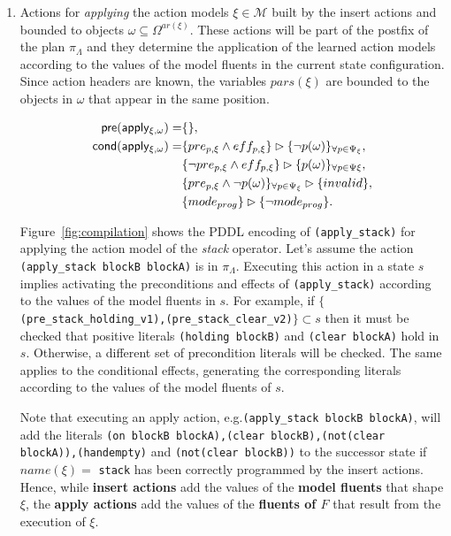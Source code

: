 \documentclass[runningheads]{llncs}
\newcommand{\pre}{\mathsf{pre}}     %
\newcommand{\cond}{\mathsf{cond}}   %
\begin{document}
\begin{itemize}
\begin{enumerate}
\item Actions for {\em applying} the action models $\xi\in\mathcal{M}$ built by the insert actions and bounded to objects $\omega\subseteq\Omega^{ar(\xi)}$. These actions will be part of the postfix of the plan $\pi_\Lambda$ and they determine the application of the learned action models according to the values of the model fluents in the current state configuration. Since action headers are known, the variables $pars(\xi)$ are bounded to the objects in $\omega$ that appear in the same position.

\begin{small}
\begin{align*}
\hspace*{7pt}\pre(\mathsf{apply_{\xi,\omega}})=&\{\},\\
\cond(\mathsf{apply_{\xi,\omega}})=& \{pre_{p,\xi}\wedge eff_{p,\xi}\}\rhd\{\neg p(\omega)\}_{\forall p\in\Psi_\xi},\\
& \{\neg pre_{p,\xi}\wedge eff_{p,\xi}\}\rhd\{p(\omega)\}_{\forall p\in\Psi\xi},\\
& \{pre_{p,\xi}\wedge \neg p(\omega)\}_{\forall p\in\Psi_\xi}\rhd\{invalid\},\\
&\{mode_{prog}\}\rhd\{\neg mode_{prog}\}.
\end{align*}
\end{small}

Figure~\ref{fig:compilation} shows the PDDL encoding of {\tt{\small (apply\_stack)}} for applying the action model of the {\em stack} operator. Let's assume the action {\tt{\small (apply\_stack blockB blockA)}} is in $\pi_\Lambda$. Executing this action in a state $s$ implies activating the preconditions and effects of {\tt{\small (apply\_stack)}} according to the values of the model fluents in $s$. For example, if  $\{${\tt{\small (pre\_stack\_holding\_v1),(pre\_stack\_clear\_v2)}}$\} \subset s$ then it must be checked that positive literals {\tt{\small (holding blockB)}} and {\tt{\small (clear blockA)}} hold in $s$. Otherwise, a different set of precondition literals will be checked. The same applies to the conditional effects, generating the corresponding literals according to the values of the model fluents of $s$.

Note that executing an apply action, e.g.{\tt{\small (apply\_stack blockB blockA)}}, will add the literals {\tt{\small (on blockB blockA),(clear blockB),(not(clear blockA)),(handempty)}} and {\tt{\small(not(clear blockB))}} to the successor state if $name(\xi)=$ {\tt{\small stack}} has been correctly programmed by the insert actions. Hence, while \textbf{insert actions} add the values of the \textbf{model fluents} that shape $\xi$, the \textbf{apply actions} add the values of the \textbf{fluents of $F$} that result from the execution of $\xi$.



\end{enumerate}
\end{itemize}
\end{document}
